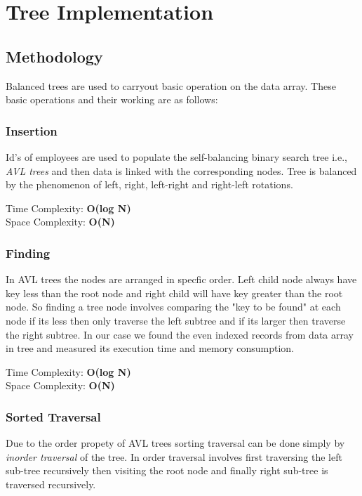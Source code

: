 \chapter{Tree Implementation} %
\label{Chapter6}

\section{Methodology}
Balanced trees are used to carryout basic operation on the data array. These basic operations and their working are as follows:

	\subsection{Insertion}
	Id's of employees are used to populate the self-balancing binary search tree i.e.,\textit{ AVL trees} and then data is linked with the corresponding nodes. Tree is balanced by the phenomenon of left, right, left-right and right-left rotations.
	
	Time Complexity: \textbf{O(log N)} \\
	Space Complexity: \textbf{O(N)}
	
	\subsection{Finding}
	In AVL trees the nodes are arranged in specfic order. Left child node always have key less than the root node and right child will have key greater than the root node. So finding a tree node involves comparing the "key to be found" at each node if its less then only traverse the left subtree and if its larger then traverse the right subtree. In our case we found the even indexed records from data array in tree and measured its execution time and memory consumption.
	
	Time Complexity: \textbf{O(log N)} \\
	Space Complexity: \textbf{O(N)}
	
	\subsection{Sorted Traversal}
	Due to the order propety of AVL trees sorting traversal can be done simply by \textit{inorder traversal} of the tree. In order traversal involves first traversing the left sub-tree recursively then visiting the root node and finally right sub-tree is traversed recursively.
	
